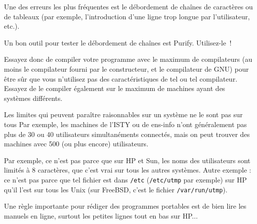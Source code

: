 
Une des erreurs les plus fréquentes est le débordement de chaînes de
caractères ou de tableaux (par exemple, l'introduction d'une ligne trop
longue par l'utilisateur, etc.).

Un bon outil pour tester le débordement de chaînes est Purify. Utilisez-le~!



Essayez donc de compiler votre programme avec le maximum de compilateurs
(au moins le compilateur fourni par le constructeur, et le compilateur
de GNU) pour être sûr que vous n'utilisez pas des caractéristiques de
tel ou tel compilateur.  Essayez de le compiler également sur le maximum
de machines ayant des systèmes différents.




Les limites qui peuvent paraître raisonnables sur un système ne le sont
pas sur tous Par exemple, les machines de l'ISTY ou de ens-info n'ont
généralement pas plus de 30 ou 40 utilisateurs simultanéments connectés,
mais on peut trouver des machines avec 500 (ou plus encore)
utilisateurs.



Par exemple, ce n'est pas parce que sur HP et Sun, les noms des
utilisateurs sont limités à 8 caractères, que c'est vrai sur tous les
autres systèmes.  Autre exemple :  ce n'est pas parce que tel fichier
est dans {\tt /etc} ({\tt /etc/utmp} par exemple) sur HP qu'il l'est sur
tous les Unix (sur FreeBSD, c'est le fichier {\tt /var/run/utmp}).



Une règle importante pour rédiger des programmes portables est de bien lire
les manuels en ligne, surtout les petites lignes tout en bas sur HP...


